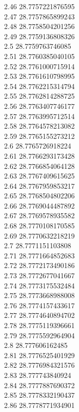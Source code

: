 {2.46	28.7757221876595\\
2.47	28.7757865899243\\
2.48	28.7758504201256\\
2.49	28.7759136808326\\
2.5	28.7759763746085\\
2.51	28.7760385040105\\
2.52	28.7761000715914\\
2.53	28.7761610798995\\
2.54	28.7762215314794\\
2.55	28.7762814288725\\
2.56	28.7763407746177\\
2.57	28.7763995712514\\
2.58	28.7764578213082\\
2.59	28.7765155273212\\
2.6	28.7765726918224\\
2.61	28.7766293173428\\
2.62	28.7766854064128\\
2.63	28.7767409615625\\
2.64	28.7767959853217\\
2.65	28.7768504802206\\
2.66	28.7769044487892\\
2.67	28.7769578935582\\
2.68	28.7770108170585\\
2.69	28.7770632218219\\
2.7	28.7771151103808\\
2.71	28.7771664852683\\
2.72	28.7772173490186\\
2.73	28.7772677041667\\
2.74	28.7773175532484\\
2.75	28.7773668988008\\
2.76	28.7774157433617\\
2.77	28.7774640894702\\
2.78	28.7775119396661\\
2.79	28.7775592964904\\
2.8	28.777606162485\\
2.81	28.7776525401929\\
2.82	28.7776984321576\\
2.83	28.777743840924\\
2.84	28.7777887690372\\
2.85	28.7778332190437\\
2.86	28.7778771934901\\
}

